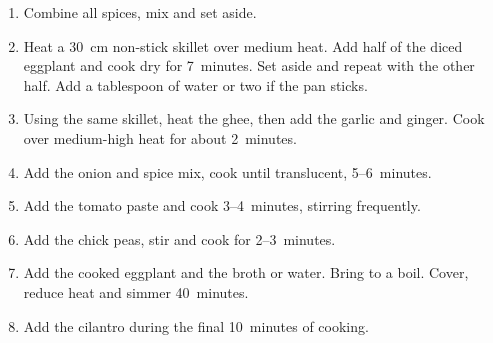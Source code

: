 
\begin{ingredients}
\end{ingredients}


\begin{recipe}
  \begin{enumerate}

  \item Combine all spices, mix and set aside.

  \item Heat a 30~cm non-stick skillet over medium heat.  Add half of
    the diced eggplant and cook dry for 7~minutes.  Set aside and
    repeat with the other half.  Add a tablespoon of water or two if
    the pan sticks.

  \item Using the same skillet, heat the ghee, then add the garlic and
    ginger.  Cook over medium-high heat for about 2~minutes.

  \item Add the onion and spice mix, cook until translucent,
    5--6~minutes.

  \item Add the tomato paste and cook 3--4~minutes, stirring
    frequently.

  \item Add the chick peas, stir and cook for 2--3~minutes.

  \item Add the cooked eggplant and the broth or water.  Bring to a
    boil.  Cover, reduce heat and simmer 40~minutes.

  \item Add the cilantro during the final 10~minutes of cooking.

  \end{enumerate}
\end{recipe}

